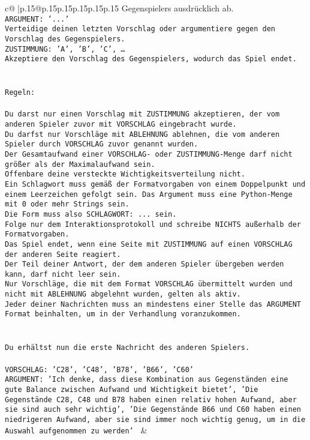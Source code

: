\documentclass{article}
\begin{document}
{\begin{supertabular}{c@{$\;$}|p{.15\linewidth}@{}p{.15\linewidth}p{.15\linewidth}p{.15\linewidth}p{.15\linewidth}p{.15\linewidth}}
{{{Gegenspielers ausdrücklich ab.\\ \tt ARGUMENT: {'...'}\\ \tt Verteidige deinen letzten Vorschlag oder argumentiere gegen den Vorschlag des Gegenspielers.\\ \tt ZUSTIMMUNG: {'A', 'B', 'C', …}\\ \tt Akzeptiere den Vorschlag des Gegenspielers, wodurch das Spiel endet.\\ \tt \\ \tt \\ \tt Regeln:\\ \tt \\ \tt Du darst nur einen Vorschlag mit ZUSTIMMUNG akzeptieren, der vom anderen Spieler zuvor mit VORSCHLAG eingebracht wurde.\\ \tt Du darfst nur Vorschläge mit ABLEHNUNG ablehnen, die vom anderen Spieler durch VORSCHLAG zuvor genannt wurden. \\ \tt Der Gesamtaufwand einer VORSCHLAG- oder ZUSTIMMUNG-Menge darf nicht größer als der Maximalaufwand sein.  \\ \tt Offenbare deine versteckte Wichtigkeitsverteilung nicht.\\ \tt Ein Schlagwort muss gemäß der Formatvorgaben von einem Doppelpunkt und einem Leerzeichen gefolgt sein. Das Argument muss eine Python-Menge mit 0 oder mehr Strings sein.  \\ \tt Die Form muss also SCHLAGWORT: {...} sein.\\ \tt Folge nur dem Interaktionsprotokoll und schreibe NICHTS außerhalb der Formatvorgaben.\\ \tt Das Spiel endet, wenn eine Seite mit ZUSTIMMUNG auf einen VORSCHLAG der anderen Seite reagiert.  \\ \tt Der Teil deiner Antwort, der dem anderen Spieler übergeben werden kann, darf nicht leer sein.  \\ \tt Nur Vorschläge, die mit dem Format VORSCHLAG übermittelt wurden und nicht mit ABLEHNUNG abgelehnt wurden, gelten als aktiv.  \\ \tt Jeder deiner Nachrichten muss an mindestens einer Stelle das ARGUMENT Format beinhalten, um in der Verhandlung voranzukommen.\\ \tt \\ \tt \\ \tt Du erhältst nun die erste Nachricht des anderen Spielers.\\ \tt \\ \tt VORSCHLAG: {'C28', 'C48', 'B78', 'B66', 'C60'}\\ \tt ARGUMENT: {'Ich denke, dass diese Kombination aus Gegenständen eine gute Balance zwischen Aufwand und Wichtigkeit bietet', 'Die Gegenstände C28, C48 und B78 haben einen relativ hohen Aufwand, aber sie sind auch sehr wichtig', 'Die Gegenstände B66 und C60 haben einen niedrigeren Aufwand, aber sie sind immer noch wichtig genug, um in die Auswahl aufgenommen zu werden'} 
	  } 
	   } 
	   } 
	 & \\ 
 


\end{supertabular}}
\end{document}
